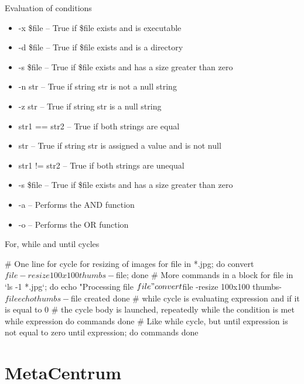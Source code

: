 \documentclass[compress, ucs, xelatex, 11pt, xcolor=svgnames,
  hyperref={
    bookmarks=true,
    unicode=true,
    colorlinks=true,
    pdftitle={Linux, command line and MetaCentrum},
    plainpages=false,
    pdfauthor={Vojtech Zeisek},
    pdfsubject={Course about use of Linux command line, writing shell scripts and using MetaCentrum of CESNET},
    pdfcreator={XeLaTeX},
    pdfkeywords={Linux, GNU, BASH, shell, command line, MetaCentrum},
    linkcolor=Red,
    anchorcolor=Blue,
    citecolor=Purple,
    filecolor=DodgerBlue,
    menucolor=DarkOrchid,
    urlcolor=DeepSkyBlue,
    pdftex},
  url={hyphens, lowtilde} %
  ]{beamer}
\begin{document}
\begin{frame}[allowframebreaks]{Evaluation of conditions}
\begin{itemize}
  \item -x \$file -- True if \$file exists and is executable
  \item -d \$file -- True if \$file exists and is a directory
  \item -s \$file -- True if \$file exists and has a size greater than zero
  \item -n str -- True if string str is not a null string
  \item -z str -- True if string str is a null string
  \item str1 == str2 -- True if both strings are equal
  \item str -- True if string str is assigned a value and is not null
  \item str1 != str2 -- True if both strings are unequal
  \item -s \$file -- True if \$file exists and has a size greater than zero
  \item -a -- Performs the AND function
  \item -o -- Performs the OR function
\end{itemize}
\end{frame}

\begin{frame}[fragile]{For, while and until cycles}
  \begin{bashcode}
    # One line for cycle for resizing of images
    for file in *.jpg; do convert $file -resize 100x100 thumbs-$file; done
    # More commands in a block
    for file in `ls -1 *.jpg`; do
      echo "Processing file $file"
      convert $file -resize 100x100 thumbs-$file
      echo thumbs-$file created
      done
    # while cycle is evaluating expression and if it is equal to 0
    # the cycle body is launched, repeatedly while the condition is met
    while expression
      do
        commands
      done
    # Like while cycle, but until expression is not equal to zero
    until expression; do
      commands
      done
  \end{bashcode}
\end{frame}

\section{MetaCentrum}
\end{document}
